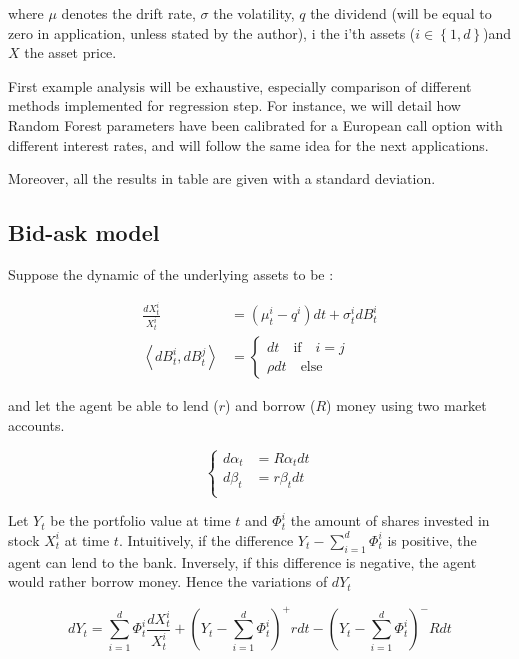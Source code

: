 \documentclass[english,11pt,openany]{report}
\theoremstyle{definition}
\theoremstyle{plain}
\theoremstyle{definition}
\begin{document}
where $\mu$ denotes the drift rate, $\sigma$ the volatility, $q$ the dividend (will be equal to zero in application, unless stated by the author), i the i'th assets ($i \in \left\lbrace1, d\right\rbrace$)and $X$ the asset price.

First example analysis will be exhaustive, especially comparison of  different methods implemented for regression step.
For instance, we will detail how Random Forest parameters have been calibrated for a European call option with different interest rates, and will follow the same idea for the next applications.    

Moreover, all the  results in table are given with a standard deviation. 

\subsection{Bid-ask model}

Suppose the dynamic of the underlying assets to be : 

\begin{align}
\frac{dX_t^i}{X_t^i} & = (\mu^i_t - q^i) dt + \sigma^i_t dB_t^i\\
\left\langle dB_t^i,dB_t^j \right\rangle &= \left\{ \begin{array}{ll}
										dt \quad \text{if} \quad i=j \\
								\rho dt \quad \text{else} 
								\end{array}
								\right.
\end{align}

and let the agent be able to lend ($r$) and borrow ($R$) money using two market accounts. 

\begin{equation}
\left\{
\begin{aligned}
d\alpha_t &= R \alpha_t dt\\
d\beta_t &= r \beta_t dt\\
\end{aligned}
\right.
\end{equation}

\noindent
Let $Y_t$ be the portfolio value at time $t$ and $\Phi^i_t$ the amount of shares invested in stock $X_t^i$ at time $t$. Intuitively, if the difference $Y_t - \sum_{i = 1}^{d} \Phi^i_t$ is positive, the agent can lend to the bank. Inversely, if this difference is negative, the agent would rather borrow money. 
\noindent
Hence the variations of $dY_t$

\begin{displaymath}
dY_t = \sum_{i = 1}^{d} \Phi^i_t \frac{dX^i_t}{X^i_t} + (Y_t - \sum_{i = 1}^{d} \Phi^i_t)^+rdt - (Y_t - \sum_{i = 1}^{d} \Phi^i_t)^-Rdt
\end{displaymath}
\end{document}
